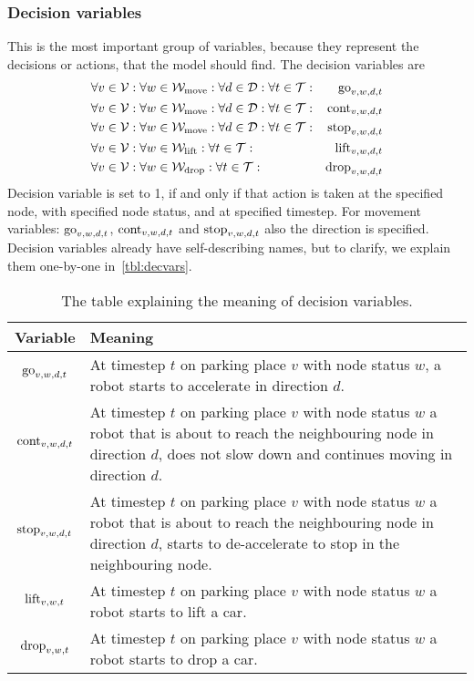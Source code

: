 \subsubsection{Decision variables}
This is the most important group of variables, because they represent the
decisions or actions, that the model should find. The decision variables are
\begin{align}
    &\forall v \in \mathcal{V}: \forall w \in \mathcal{W}_\mathrm{move}: \forall d \in \mathcal{D}: \forall t \in \mathcal{T}: &
    \mathrm{go}_{v,w,d,t}\\
    &\forall v \in \mathcal{V}: \forall w \in \mathcal{W}_\mathrm{move}: \forall d \in \mathcal{D}: \forall t \in \mathcal{T}: &
    \mathrm{cont}_{v,w,d,t}\\
    &\forall v \in \mathcal{V}: \forall w \in \mathcal{W}_\mathrm{move}: \forall d \in \mathcal{D}: \forall t \in \mathcal{T}: &
    \mathrm{stop}_{v,w,d,t}\\
    &\forall v \in \mathcal{V}: \forall w \in \mathcal{W}_\mathrm{lift}: \forall t \in \mathcal{T}: &
    \mathrm{lift}_{v,w,d,t}\\
    &\forall v \in \mathcal{V}: \forall w \in \mathcal{W}_\mathrm{drop}: \forall t \in \mathcal{T}: &
    \mathrm{drop}_{v,w,d,t}
\end{align}
Decision variable is set to 1, if and only if that action is taken at the
specified node, with specified node status, and at specified timestep. For
movement variables: $\mathrm{go}_{v,w,d,t}$, $\mathrm{cont}_{v,w,d,t}$ and $\mathrm{stop}_{v,w,d,t}$
also the direction is specified. Decision variables already have
self-describing names, but to clarify, we explain them one-by-one
in~\autoref{tbl:decvars}.

\begin{table}[h]
    \center
    \begin{tabular}{| c | p{\textwidth - 2.6cm} |}
        \hline
        Variable & Meaning\\
        \hline
        $\mathrm{go}_{v,w,d,t}$ & At timestep $t$ on parking place $v$ with node status
        $w$, a robot starts to accelerate in direction $d$.\\ \hline
        $\mathrm{cont}_{v,w,d,t}$ & At timestep $t$ on parking place $v$ with node status
        $w$ a robot that is about to reach the neighbouring node in direction
        $d$, does not slow down and continues moving in direction $d$.\\ \hline
        $\mathrm{stop}_{v,w,d,t}$ & At timestep $t$ on parking place $v$ with node status
        $w$ a robot that is about to reach the neighbouring node in direction
        $d$, starts to de-accelerate to stop in the neighbouring node.\\ \hline
        $\mathrm{lift}_{v,w,t}$ & At timestep $t$ on parking place $v$ with node status
        $w$ a robot starts to lift a car.\\ \hline
        $\mathrm{drop}_{v,w,t}$ & At timestep $t$ on parking place $v$ with node status
        $w$ a robot starts to drop a car.\\
        \hline
    \end{tabular}
    \caption{The table explaining the meaning of decision variables.}
    \label{tbl:decvars}
\end{table}

